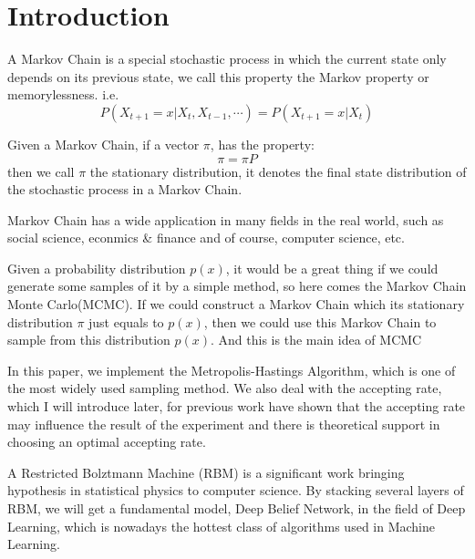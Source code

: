 


\section{Introduction} \label{sec:introduction}

A Markov Chain is a special stochastic process in which the current state only depends on its previous state, we call this property the Markov property or memorylessness. i.e.
\begin{equation}
P(X_{t+1}=x|X_t, X_{t-1}, \cdots) =P(X_{t+1}=x|X_t)
\end{equation}

Given a Markov Chain, if a vector $\pi$, has the property:
\begin{equation}
\pi=\pi P
\end{equation}
then we call $\pi$ the stationary distribution, it denotes the final state distribution of the stochastic process in a Markov Chain.

Markov Chain has a wide application in many fields in the real world, such as social science\cite{acemoglu2011political}, econmics \& finance\cite{hamilton1989new} and of course, computer science\cite{page1999pagerank}, etc.

Given a probability distribution $p(x)$, it would be a great thing if we could generate some samples of it by a simple method, so here comes the Markov Chain Monte Carlo(MCMC). If we could construct a Markov Chain which its stationary distribution $\pi$ just equals to $p(x)$, then we could use this Markov Chain to sample from this distribution $p(x)$. And this is the main idea of MCMC

In this paper, we implement the Metropolis-Hastings Algorithm, which is one of the most widely used sampling method. We also deal with the accepting rate, which I will introduce later, for previous work\cite{roberts1997weak} have shown that the accepting rate may influence the result of the experiment and there is theoretical support in choosing an optimal accepting rate.

A Restricted Bolztmann Machine (RBM)\cite{mcclelland1987parallel} is a significant work bringing hypothesis in statistical physics to computer science. By stacking several layers of RBM, we will get a fundamental model, Deep Belief Network\cite{hinton2006reducing}, in the field of Deep Learning, which is nowadays the hottest class of algorithms used in Machine Learning.

